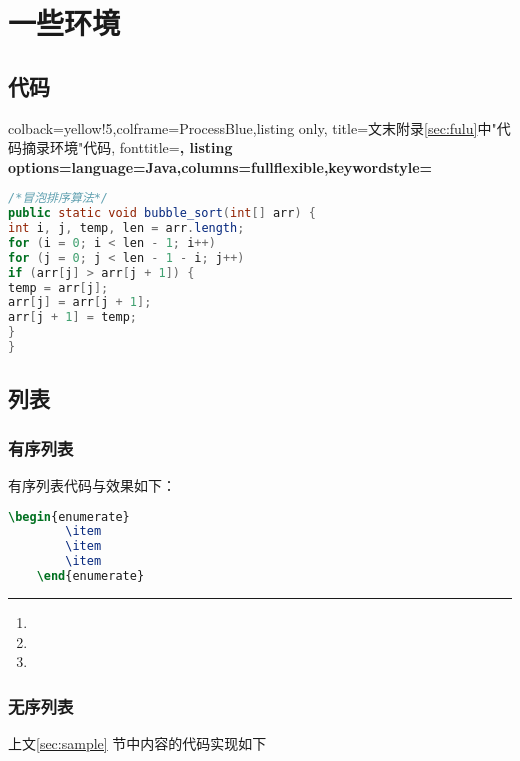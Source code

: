 \documentclass{imutthesis}
\begin{document}
\section{一些环境}
\subsection{代码}

\begin{tcblisting}{colback=yellow!5,colframe=ProcessBlue,listing only,
		title=文末附录\ref{sec:fulu}中"代码摘录环境"代码, fonttitle=\bfseries,
		listing options={language=Java,columns=fullflexible,keywordstyle=\color{red}}} 
\begin{lstlisting}[language=Java] 
/*冒泡排序算法*/ 
public static void bubble_sort(int[] arr) {
int i, j, temp, len = arr.length;
for (i = 0; i < len - 1; i++)
for (j = 0; j < len - 1 - i; j++) 
if (arr[j] > arr[j + 1]) {
temp = arr[j];
arr[j] = arr[j + 1];
arr[j + 1] = temp;
}
}
\end{lstlisting} 
\end{tcblisting}

\subsection{列表}


\subsubsection{有序列表}
有序列表代码与效果如下：

\begin{minipage}[t]{0.48\textwidth}
\begin{lstlisting}[language=TeX]
	\begin{enumerate}
		\item 
		\item 
		\item 
	\end{enumerate}
\end{lstlisting} 
\end{minipage}
\begin{minipage}[t]{0.48\textwidth}
	\rule[-10pt]{10cm}{0em}
	\begin{enumerate}
		\item 
		\item 
		\item 
	\end{enumerate}
\end{minipage}
\subsubsection{无序列表}
上文\ref{sec:sample} 节中内容的代码实现如下
\end{document}
